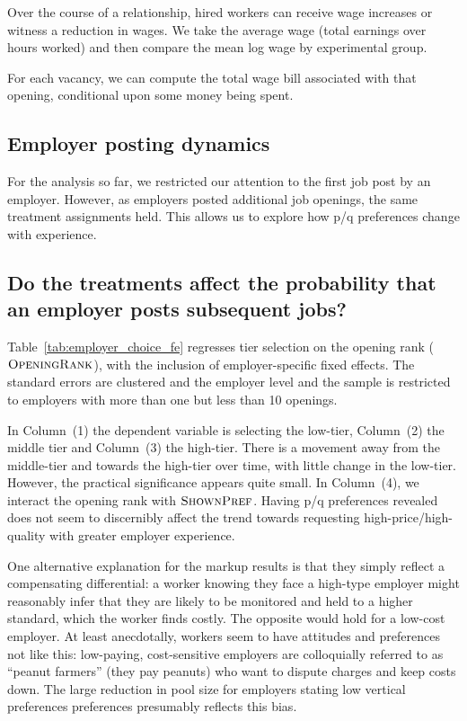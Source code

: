 Over the course of a relationship, hired workers can receive wage increases or witness a reduction in wages. 
We take the average wage (total earnings over hours worked) and then compare the mean log wage by experimental group. 

For each vacancy, we can compute the total wage bill associated with that opening, conditional upon some money being spent.


\subsection{Employer posting dynamics} \label{sec:dynamics} 
For the analysis so far, we restricted our attention to the first job post by an employer.
However, as employers posted additional job openings, the same treatment assignments held.
This allows us to explore how p/q preferences change with experience. 

\subsection{Do the treatments affect the probability that an employer posts subsequent jobs?}

Table~\ref{tab:employer_choice_fe} regresses tier selection on the opening rank ($\textsc{OpeningRank}$), with the inclusion of employer-specific fixed effects.
The standard errors are clustered and the employer level and the sample is restricted to employers with more than one but less than 10 openings.



In Column~(1) the dependent variable is selecting the low-tier, Column~(2) the middle tier and Column~(3) the high-tier.
There is a movement away from the middle-tier and towards the high-tier over time, with little change in the low-tier.
However, the practical significance appears quite small.
In Column~(4), we interact the opening rank with $\textsc{ShownPref}$. 
Having p/q preferences revealed does not seem to discernibly affect the trend towards requesting high-price/high-quality with greater employer experience.


One alternative explanation for the markup results is that they simply reflect a compensating differential:
a worker knowing they face a high-type employer might reasonably infer that they are likely to be monitored and held to a higher standard, which the worker finds costly.
The opposite would hold for a low-cost employer. 
At least anecdotally, workers seem to have attitudes and preferences not like this:
low-paying, cost-sensitive employers are colloquially referred to as ``peanut farmers'' (they pay peanuts) who want to dispute charges and keep costs down.
The large reduction in pool size for employers stating low vertical preferences preferences presumably reflects this bias.

